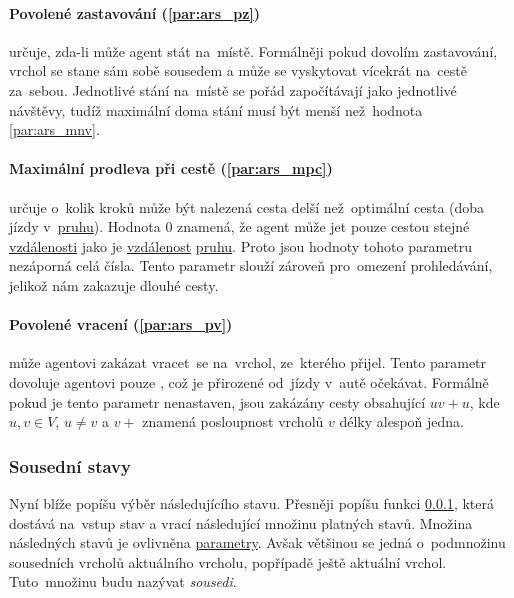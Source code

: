 \paragraph{Povolené zastavování (\ref{par:ars_pz})}
určuje, zda-li může agent stát na~místě.
Formálněji pokud dovolím zastavování, vrchol se stane sám sobě sousedem a může se vyskytovat vícekrát na~cestě za~sebou.
Jednotlivé stání na~místě se pořád započítávají jako jednotlivé návštěvy,
tudíž maximální doma stání musí být menší než~hodnota \ref{par:ars_mnv}.

\paragraph{Maximální prodleva při cestě (\ref{par:ars_mpc})}
určuje o~kolik kroků může být nalezená cesta delší než~optimální cesta (doba jízdy v~\hyperref[par:pruh]{pruhu}).
Hodnota $0$ znamená, že agent může jet pouze cestou stejné \hyperref[par:ars_vzdalenost]{vzdálenosti}
jako je \hyperref[par:ars_vzdalenost]{vzdálenost} \hyperref[par:pruh]{pruhu}.
Proto jsou hodnoty tohoto parametru nezáporná celá čísla.
Tento parametr slouží zároveň pro~omezení prohledávání, jelikož nám zakazuje dlouhé cesty.

\paragraph{Povolené vracení (\ref{par:ars_pv})}
může agentovi zakázat vracet~se na~vrchol, ze~kterého přijel.
Tento parametr dovoluje agentovi pouze , což je přirozené od~jízdy v~autě očekávat.
Formálně pokud je tento parametr nenastaven, jsou zakázány cesty obsahující $uv+u$,
kde $u, v \in V$, $u \neq v$ a $v+$ znamená posloupnost vrcholů $v$ délky alespoň jedna.

\subsubsection{Sousední stavy}\label{subsubsec:sousedni_stavy}

Nyní blíže popíšu výběr následujícího stavu.
Přesněji popíšu funkci \ref{subsubsec:sousedni_stavy},
která dostává na~vstup stav a vrací následující množinu platných stavů.
Množina následných stavů je ovlivněna \hyperref[subsubsec:ars_parametry]{parametry}.
Avšak většinou se jedná o~podmnožinu sousedních vrcholů aktuálního vrcholu, popřípadě ještě aktuální vrchol.
Tuto~množinu budu nazývat \emph{sousedi}.

